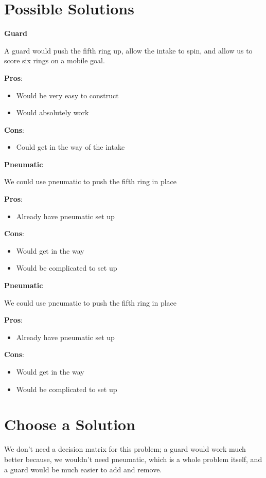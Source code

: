 \section*{Possible Solutions}
\noindent
\textbf{Guard}

A guard would push the fifth ring up, allow the intake to spin, and allow us to score six rings on a mobile goal. 

\noindent
\textbf{Pros}:
\begin{itemize}
    \item Would be very easy to construct
    \item Would absolutely work
\end{itemize}
\textbf{Cons}:
\begin{itemize}
    \item Could get in the way of the intake
\end{itemize}

\noindent
\textbf{Pneumatic}

We could use pneumatic to push the fifth ring in place

\noindent
\textbf{Pros}:
\begin{itemize}
    \item Already have pneumatic set up
\end{itemize}
\textbf{Cons}:
\begin{itemize}
    \item Would get in the way
    \item Would be complicated to set up
\end{itemize}

\noindent
\textbf{Pneumatic}

We could use pneumatic to push the fifth ring in place

\noindent
\textbf{Pros}:
\begin{itemize}
    \item Already have pneumatic set up
\end{itemize}
\textbf{Cons}:
\begin{itemize}
    \item Would get in the way
    \item Would be complicated to set up
\end{itemize}

\section*{Choose a Solution}
We don't need a decision matrix for this problem; a guard would work much better because, we wouldn't need pneumatic, which is a whole problem itself, and a guard would be much easier to add and remove. 
